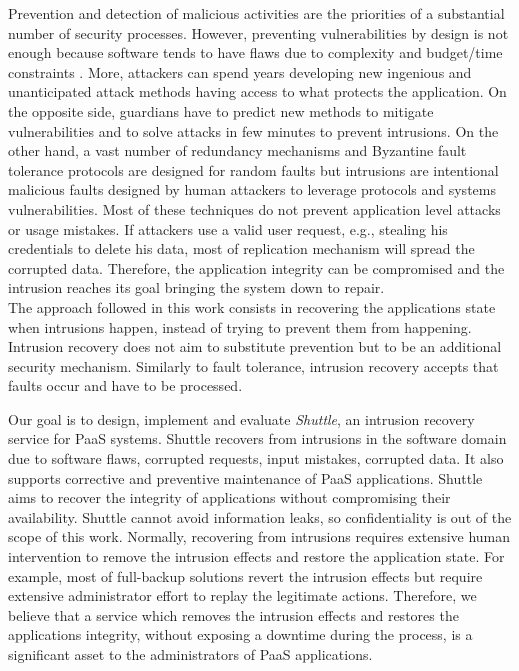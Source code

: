 Prevention and detection of malicious activities are the priorities of a substantial number of security processes. However, preventing vulnerabilities by design is not enough because software tends to have flaws due to complexity and budget/time constraints \cite{Charette2005}. More, attackers can spend years developing new ingenious and unanticipated attack methods having access to what protects the application. On the opposite side, guardians have to predict new methods to mitigate vulnerabilities and to solve attacks in few minutes to prevent intrusions. On the other hand, a vast number of redundancy mechanisms and Byzantine fault tolerance protocols are designed for random faults but intrusions are intentional malicious faults designed by human attackers to leverage protocols and systems vulnerabilities. Most of these techniques do not prevent application level attacks or usage mistakes. If attackers use a valid user request, e.g., stealing his credentials to delete his data, most of replication mechanism will spread the corrupted data. Therefore, the application integrity can be compromised and the intrusion reaches its goal bringing the system down to repair.\\

The approach followed in this work consists in recovering the applications state when intrusions happen, instead of trying to prevent them from happening. Intrusion recovery does not aim to substitute prevention but to be an additional security mechanism. Similarly to fault tolerance, intrusion recovery accepts that faults occur and have to be processed.

Our goal is to design, implement and evaluate \textit{Shuttle}, an intrusion recovery service for PaaS systems. Shuttle recovers from intrusions in the software domain due to software flaws, corrupted requests, input mistakes, corrupted data. It also supports corrective and preventive maintenance of PaaS applications. Shuttle aims to recover the integrity of applications without compromising their availability. Shuttle cannot avoid information leaks, so confidentiality is out of the scope of this work. Normally, recovering from intrusions requires extensive human intervention to remove the intrusion effects and restore the application state. For example, most of full-backup solutions revert the intrusion effects but require extensive administrator effort to replay the legitimate actions. Therefore, we believe that a service which removes the intrusion effects and restores the applications integrity, without exposing a downtime during the process, is a significant asset to the administrators of PaaS applications.

